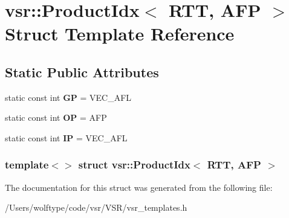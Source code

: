 \hypertarget{structvsr_1_1_product_idx_3_01_r_t_t_00_01_a_f_p_01_4}{\section{vsr\-:\-:Product\-Idx$<$ R\-T\-T, A\-F\-P $>$ Struct Template Reference}
\label{structvsr_1_1_product_idx_3_01_r_t_t_00_01_a_f_p_01_4}
}
\subsection*{Static Public Attributes}
\begin{DoxyCompactItemize}
\item 
\hypertarget{structvsr_1_1_product_idx_3_01_r_t_t_00_01_a_f_p_01_4_adb1906d97e51a990c87bc58c47792ac3}{static const int {\bfseries G\-P} = V\-E\-C\-\_\-\-A\-F\-L}\label{structvsr_1_1_product_idx_3_01_r_t_t_00_01_a_f_p_01_4_adb1906d97e51a990c87bc58c47792ac3}

\item 
\hypertarget{structvsr_1_1_product_idx_3_01_r_t_t_00_01_a_f_p_01_4_ad79b7848e23fafbdd7db6535c49138eb}{static const int {\bfseries O\-P} = A\-F\-P}\label{structvsr_1_1_product_idx_3_01_r_t_t_00_01_a_f_p_01_4_ad79b7848e23fafbdd7db6535c49138eb}

\item 
\hypertarget{structvsr_1_1_product_idx_3_01_r_t_t_00_01_a_f_p_01_4_a3117151e5146a6b8a19a5860e88403d6}{static const int {\bfseries I\-P} = V\-E\-C\-\_\-\-A\-F\-L}\label{structvsr_1_1_product_idx_3_01_r_t_t_00_01_a_f_p_01_4_a3117151e5146a6b8a19a5860e88403d6}

\end{DoxyCompactItemize}
\subsubsection*{template$<$$>$ struct vsr\-::\-Product\-Idx$<$ R\-T\-T, A\-F\-P $>$}



The documentation for this struct was generated from the following file\-:\begin{DoxyCompactItemize}
\item 
/\-Users/wolftype/code/vsr/\-V\-S\-R/vsr\-\_\-templates.\-h\end{DoxyCompactItemize}

